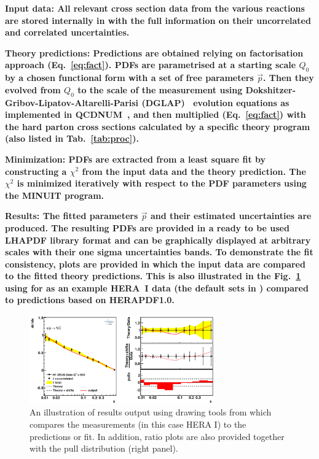 \begin{description}
\item 
\bf {Input data:} \rm  All relevant cross section data from the various reactions
are stored internally in \fitter with the full information on their uncorrelated and correlated
uncertainties.
\item
\bf{Theory predictions:} \rm Predictions are obtained relying on factorisation approach (Eq.~\ref{eq:fact}). PDFs are parametrised at a starting scale $Q_0$  by a chosen functional form with a set of free parameters $\vec{p}$. Then they evolved from $Q_0$ to the scale of the measurement using 
Dokshitzer-Gribov-Lipatov-Altarelli-Parisi 
(DGLAP)~\cite{Gribov:1972ri, Gribov:1972rt, Lipatov:1974qm,
Dokshitzer:1977sg, Altarelli:1977zs} evolution equations 
as implemented in QCDNUM~\cite{qcdnum}, 
and then multiplied (Eq.~\ref{eq:fact}) with the hard parton cross sections calculated by
a specific theory program (also listed in Tab.~\ref{tab:proc}).
\item
\bf{Minimization:} \rm  PDFs are extracted from a least square fit by constructing a 
$\chi^2$ from the input data and the theory prediction.
The $\chi^2$ is  minimized iteratively 
with respect to the PDF parameters using the MINUIT\cite{minuit} program.
%
%
\item
\bf{Results:} \rm  The fitted parameters $\vec{p}$ and their estimated uncertainties are produced.
The resulting PDFs are provided in a ready to be used LHAPDF library format
and can be graphically 
displayed at arbitrary scales with their one sigma uncertainties bands.
To demonstrate the fit consistency, plots are provided 
in which the input data are compared to the fitted theory predictions. 
This is also illustrated in the Fig.~\ref{fig:data} using for as an example 
HERA~I data (the default sets in \fitter) compared to predictions based on 
HERAPDF1.0\cite{h1zeus:2009wt}.  
\begin{figure}[!ht]
   \centering
   \includegraphics[width=8cm]{datatheory.pdf}
   \caption{An illustration of results output using drawing tools from \fitter which compares the measurements (in this case HERA I) to the predictions or fit. In addition, ratio plots are also provided together with the pull distribution (right panel).} 
 \label{fig:data}
\end{figure}

\end{description}
